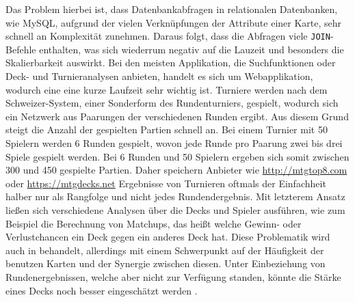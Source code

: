 Das Problem hierbei ist, dass Datenbankabfragen in relationalen Datenbanken, wie MySQL, aufgrund der vielen Verknüpfungen der Attribute einer Karte, sehr schnell an Komplexität zunehmen. Daraus folgt, dass die Abfragen viele \verb|JOIN|-Befehle enthalten, was sich wiederrum negativ auf die Lauzeit und besonders die Skalierbarkeit auswirkt. Bei den meisten Applikation, die Suchfunktionen oder Deck- und Turnieranalysen anbieten, handelt es sich um Webapplikation, wodurch eine eine kurze Laufzeit sehr wichtig ist.
Turniere werden nach dem Schweizer-System, einer Sonderform des Rundenturniers, gespielt, wodurch sich ein Netzwerk aus Paarungen der verschiedenen Runden ergibt. Aus diesem Grund steigt die Anzahl der gespielten Partien schnell an. Bei einem Turnier mit 50 Spielern werden 6 Runden gespielt, wovon jede Runde pro Paarung zwei bis drei Spiele gespielt werden. Bei 6 Runden und 50 Spielern ergeben sich somit zwischen 300 und 450 gespielte Partien. Daher speichern Anbieter wie \url{http://mtgtop8.com} oder \url{https://mtgdecks.net} Ergebnisse von Turnieren oftmals der Einfachheit halber nur als Rangfolge und nicht jedes Rundendergebnis. Mit letzterem Ansatz ließen sich verschiedene Analysen über die Decks und Spieler ausführen, wie zum Beispiel die Berechnung von Matchups, das heißt welche Gewinn- oder Verlustchancen ein Deck gegen ein anderes Deck hat. Diese Problematik wird auch in \cite{haumagic} behandelt, allerdings mit einem Schwerpunkt auf der Häufigkeit der benutzen Karten und der Synergie zwischen diesen. Unter Einbeziehung von Rundenergebnissen, welche aber nicht zur Verfügung standen, könnte die Stärke eines Decks noch besser eingeschätzt werden \cite{haumagic}.

